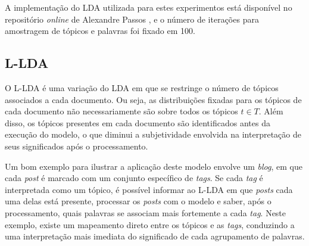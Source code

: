 A implementação do LDA utilizada para estes experimentos está disponível no repositório \emph{online} de Alexandre Passos \cite{top-lda}, e o número de iterações para amostragem de tópicos e palavras foi fixado em 100. 






\subsection{L-LDA}

O L-LDA é uma variação do LDA em que se restringe o número de tópicos associados a cada documento. Ou seja, as distribuições fixadas para os tópicos de cada documento não necessariamente são sobre todos os tópicos \ensuremath{t \in T}. Além disso, os tópicos presentes em cada documento são identificados antes da execução do modelo, o que diminui a subjetividade envolvida na interpretação de seus significados após o processamento. 

Um bom exemplo para ilustrar a aplicação deste modelo envolve um \emph{blog}, em que cada \emph{post} é marcado com um conjunto específico de \emph{tags}. Se cada \emph{tag} é interpretada como um tópico, é possível informar ao L-LDA em que \emph{posts} cada uma delas está presente, processar os \emph{posts} com o modelo e saber, após o processamento, quais palavras se associam mais fortemente a cada \emph{tag}. Neste exemplo, existe um mapeamento direto entre os tópicos e as \emph{tags}, conduzindo a uma interpretação mais imediata do significado de cada agrupamento de palavras.

